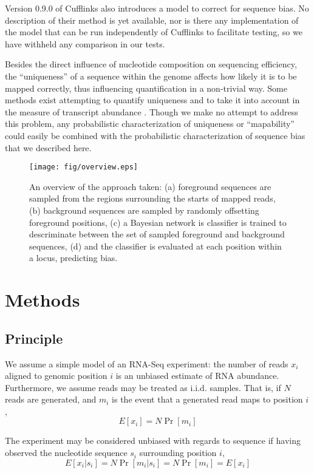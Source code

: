 \documentclass{bioinfo}
\begin{document}
Version 0.9.0 of Cufflinks \cite{Trapnell2010} also introduces a model to
correct for sequence bias. No description of their method is yet available, nor
is there any implementation of the model that can be run independently of
Cufflinks to facilitate testing, so we have withheld any comparison in our
tests.

Besides the direct influence of nucleotide composition on sequencing efficiency,
the ``uniqueness'' of a sequence within the genome affects how likely it is to
be mapped correctly, thus influencing quantification in a non-trivial way. Some
methods exist attempting to quantify uniqueness \cite{Koehler2010} and to take
it into account in the measure of transcript abundance \cite{Li2010b}
\cite{Lee2010}. Though we make no attempt to address this problem, any
probabilistic characterization of uniqueness or ``mapability'' could easily be
combined with the probabilistic characterization of sequence bias that we
described here.


\begin{figure}
\centerline{\texttt{[image: fig/overview.eps]}}
\caption{An overview of the approach taken: (a) foreground sequences are sampled
from the regions surrounding the starts of mapped reads, (b) background
sequences are sampled by randomly offsetting foreground positions, (c) a
Bayesian network is classifier is trained to descriminate between the set of
sampled foreground and background sequences, (d) and the classifier is evaluated
at each position within a locus, predicting bias.}
\label{fig:overview}
\end{figure}

\section{Methods}

\subsection{Principle}

We assume a simple model of an RNA-Seq experiment: the number of reads $x_i$
aligned to genomic position $i$ is an unbiased estimate of RNA abundance.
Furthermore, we assume reads may be treated as i.i.d. samples. That
is, if $N$ reads are generated, and $m_i$ is the event that a generated read
maps to position $i$,
$$ E[ x_i ] = N \Pr[ m_i ] $$


The experiment may be considered unbiased  with regards to sequence if having
observed the nucleotide sequence $s_i$ surrounding position $i$,
$$ E[ x_i | s_i ] = N \Pr[ m_i | s_i ] = N \Pr[ m_i ] = E[ x_i ] $$
\end{document}
